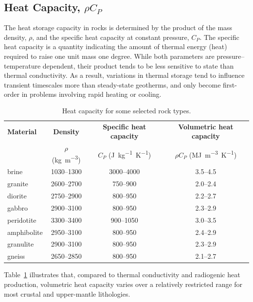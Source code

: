 \subsection{Heat Capacity, $\rho C_P$}
The heat storage capacity in rocks is determined by the product of the mass density, $\rho$, and the specific heat capacity at constant pressure, $C_P$. The specific heat capacity is a quantity indicating the amount of thermal energy (heat) required to raise one unit mass one degree.  While both parameters are pressure--temperature dependent, their product tends to be less sensitive to state than thermal conductivity.  As a result, variations in thermal storage tend to influence transient timescales more than steady-state geotherms, and only become first-order in problems involving rapid heating or cooling.
\begin{table}[tbhp]
    \centering
    \caption{Heat capacity for some selected rock types.}
    \label{tab:heatcapacity}
    \begin{tabular}{lccc}
        \toprule
        \textbf{Material} &
        \textbf{Density} & 
        \textbf{Specific heat capacity} & 
        \textbf{Volumetric heat capacity} \\
        & $\rho$ (\si{kg.m^{-3}}) &
        $C_P$ (\si{J.kg^{-1}.K^{-1}}) &
        $\rho C_P$ (\si{MJ.m^{-3}.K^{-1}}) \\
        \midrule
        brine & 1030--1300 & 3000--4000 & 3.5--4.5 \\
        granite & 2600--2700 & 750--900 & 2.0--2.4 \\
        diorite & 2750--2900 & 800--950 & 2.2--2.7 \\
        gabbro & 2900--3100 & 800--950 & 2.3--2.9 \\
        peridotite & 3300--3400 & 900--1050 & 3.0--3.5 \\
        amphibolite & 2950--3100 & 800--950 & 2.4--2.9 \\
        granulite & 2900--3100 & 800--950 & 2.3--2.9 \\
        gneiss & 2650--2850 & 800--950 & 2.1--2.7 \\
        \bottomrule
    \end{tabular}
\end{table}
Table~\ref{tab:heatcapacity} illustrates that, compared to thermal conductivity and radiogenic heat production, volumetric heat capacity varies over a relatively restricted range for most crustal and upper-mantle lithologies.

